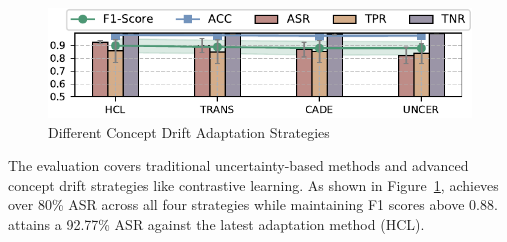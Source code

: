 \begin{figure}[h!]
	\centering
	\includegraphics[width=\linewidth,keepaspectratio]{Graph/Evaluation/Figure13.pdf}
	\caption{Different Concept Drift Adaptation Strategies}
	\label{fig:Attack-effectiveness-Concept-Drift-Strategy}
\end{figure}
The evaluation covers traditional uncertainty-based methods and advanced concept drift strategies like contrastive learning.
As shown in Figure~\ref{fig:Attack-effectiveness-Concept-Drift-Strategy}, \pandora achieves over 80\% ASR across all four strategies while maintaining F1 scores above 0.88.
\pandora attains a 92.77\% ASR against the latest adaptation method (HCL).

